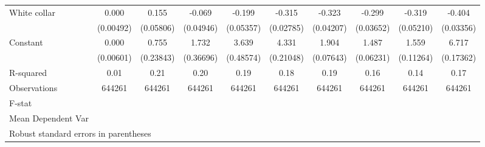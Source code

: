 {\begin{tabular}{l*{9}{c}}
White collar        &       0.000         &       0.155\sym{**} &      -0.069         &      -0.199\sym{***}&      -0.315\sym{***}&      -0.323\sym{***}&      -0.299\sym{***}&      -0.319\sym{***}&      -0.404\sym{***}\\
                    &   (0.00492)         &   (0.05806)         &   (0.04946)         &   (0.05357)         &   (0.02785)         &   (0.04207)         &   (0.03652)         &   (0.05210)         &   (0.03356)         \\
Constant            &       0.000         &       0.755\sym{**} &       1.732\sym{***}&       3.639\sym{***}&       4.331\sym{***}&       1.904\sym{***}&       1.487\sym{***}&       1.559\sym{***}&       6.717\sym{***}\\
                    &   (0.00601)         &   (0.23843)         &   (0.36696)         &   (0.48574)         &   (0.21048)         &   (0.07643)         &   (0.06231)         &   (0.11264)         &   (0.17362)         \\
\hline
R-squared           &        0.01         &        0.21         &        0.20         &        0.19         &        0.18         &        0.19         &        0.16         &        0.14         &        0.17         \\
Observations        &      644261         &      644261         &      644261         &      644261         &      644261         &      644261         &      644261         &      644261         &      644261         \\
F-stat              &                     &                     &                     &                     &                     &                     &                     &                     &                     \\
Mean Dependent Var  &                     &                     &                     &                     &                     &                     &                     &                     &                     \\
\hline\hline
\multicolumn{10}{l}{\footnotesize Robust standard errors in parentheses}\\
\end{tabular}
}
